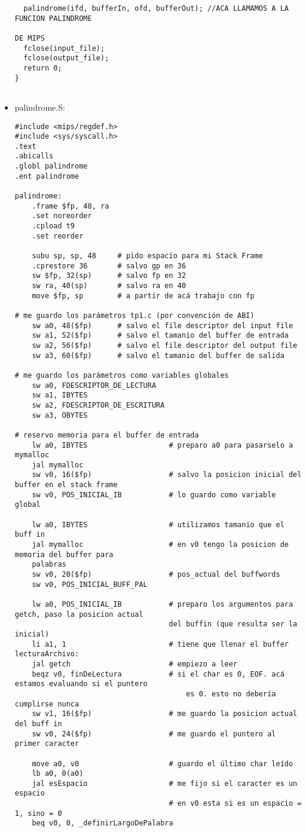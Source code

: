 \documentclass[a4paper,10pt]{article}
\begin{document}
\begin{itemize}
\begin{verbatim}
  palindrome(ifd, bufferIn, ofd, bufferOut); //ACA LLAMAMOS A LA FUNCION PALINDROME
  																			 DE MIPS
  fclose(input_file);
  fclose(output_file);
  return 0;
}


\end{verbatim}
\item palindrome.S: \\
\begin{verbatim}
#include <mips/regdef.h>
#include <sys/syscall.h>
.text
.abicalls
.globl palindrome
.ent palindrome

palindrome:
	.frame $fp, 48, ra
	.set noreorder
	.cpload t9
	.set reorder

	subu sp, sp, 48 	# pido espacio para mi Stack Frame
	.cprestore 36		# salvo gp en 36
	sw $fp, 32(sp)		# salvo fp en 32
	sw ra, 40(sp)		# salvo ra en 40
	move $fp, sp		# a partir de acá trabajo con fp
	
# me guardo los parámetros tp1.c (por convención de ABI)
	sw a0, 48($fp)		# salvo el file descriptor del input file
	sw a1, 52($fp)		# salvo el tamanio del buffer de entrada
	sw a2, 56($fp)		# salvo el file descriptor del output file
	sw a3, 60($fp)		# salvo el tamanio del buffer de salida

# me guardo los parámetros como variables globales
	sw a0, FDESCRIPTOR_DE_LECTURA
	sw a1, IBYTES
	sw a2, FDESCRIPTOR_DE_ESCRITURA
	sw a3, OBYTES

# reservo memoria para el buffer de entrada
	lw a0, IBYTES					# preparo a0 para pasarselo a mymalloc
	jal mymalloc
	sw v0, 16($fp)					# salvo la posicion inicial del buffer en el stack frame
	sw v0, POS_INICIAL_IB 			# lo guardo como variable global

	lw a0, IBYTES					# utilizamos tamanio que el buff in
	jal mymalloc					# en v0 tengo la posicion de memoria del buffer para 
	palabras
	sw v0, 20($fp)					# pos_actual del buffwords
	sw v0, POS_INICIAL_BUFF_PAL

	lw a0, POS_INICIAL_IB			# preparo los argumentos para getch, paso la posicion actual
	 								del buffin (que resulta ser la inicial)
	li a1, 1						# tiene que llenar el buffer
lecturaArchivo:
	jal getch						# empiezo a leer
	beqz v0, finDeLectura			# si el char es 0, EOF. acá estamos evaluando si el puntero 
										es 0. esto no debería cumplirse nunca
	sw v1, 16($fp)					# me guardo la posicion actual del buff in
	sw v0, 24($fp)					# me guardo el puntero al primer caracter
	
	move a0, v0						# guardo el último char leído
	lb a0, 0(a0)
	jal esEspacio					# me fijo si el caracter es un espacio
									# en v0 esta si es un espacio = 1, sino = 0
	beq v0, 0, _definirLargoDePalabra	


\end{verbatim}
\end{itemize}
\end{document}
